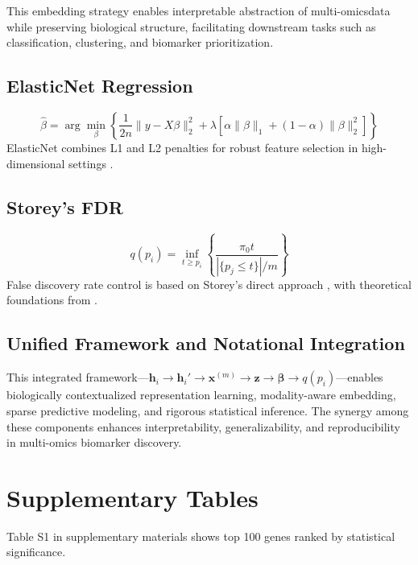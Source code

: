 \documentclass[12pt]{article}
\begin{document}
This embedding strategy enables interpretable abstraction of multi-omicsdata while preserving biological structure, facilitating downstream tasks such as classification, clustering, and biomarker prioritization.
\subsection*{ElasticNet Regression}
\[
\hat{\beta} = \arg \min_{\beta} \left\{ \frac{1}{2n} \| y - X\beta \|_2^2 + \lambda \left[\alpha \|\beta\|_1 + (1 - \alpha) \|\beta\|_2^2\right] \right\}
\]
ElasticNet combines L1 and L2 penalties for robust feature selection in high-dimensional settings \citep{zou2005regularization}.

\subsection*{Storey's FDR}
\[
q(p_i) = \inf_{t \geq p_i} \left\{ \frac{\pi_0 t}{|\{p_j \leq t\}| / m} \right\}
\]
False discovery rate control is based on Storey's direct approach \citep{storey2002fdr, storey2003statistical}, with theoretical foundations from \citep{benjamini1995controlling, benjamini2001control, dudoit2003multiple}. 

\subsection*{Unified Framework and Notational Integration}

This integrated framework—\( \mathbf{h}_i \rightarrow \mathbf{h}_i' \rightarrow \mathbf{x}^{(m)} \rightarrow \mathbf{z} \rightarrow \hat{\boldsymbol{\beta}} \rightarrow q(p_i) \)—enables biologically contextualized representation learning, modality-aware embedding, sparse predictive modeling, and rigorous statistical inference. The synergy among these components enhances interpretability, generalizability, and reproducibility in multi-omics biomarker discovery.

\section*{Supplementary Tables}
Table S1 in supplementary materials shows top 100 genes ranked by statistical significance.
\end{document}
